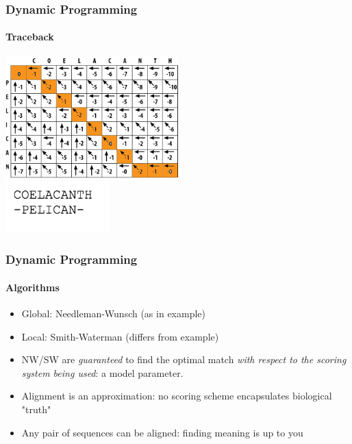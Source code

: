 \documentclass[table]{beamer}
\begin{document}
    \begin{frame}
     \frametitle{Dynamic Programming}
     \framesubtitle{Traceback}
       \begin{center}
         \includegraphics[width=0.5\textwidth]{images/traceback} \\
         \includegraphics[width=0.3\textwidth]{images/traceback_sequence}         
       \end{center}
    \end{frame}     

    \begin{frame}
     \frametitle{Dynamic Programming}
     \framesubtitle{Algorithms}
       \begin{itemize}
         \item<1-> Global: Needleman-Wunsch (as in example)
         \item<1-> Local: Smith-Waterman (differs from example)
         \item<2-> NW/SW are \emph{guaranteed} to find the optimal match \emph{with respect to the scoring system being used}: a model parameter.
         \item<2-> Alignment is an approximation: no scoring scheme encapsulates biological "truth"
         \item<2-> Any pair of sequences can be aligned: finding meaning is up to you
       \end{itemize}
    \end{frame}   
\end{document}
